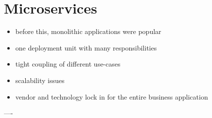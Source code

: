 \section{Microservices}



\begin{itemize}
	\item before this, monolithic applications were popular
	\item one deployment unit with many responsibilities
	\item tight coupling of different use-cases
	\item scalability issues
	\item vendor and technology lock in for the entire business application
\end{itemize}

----

